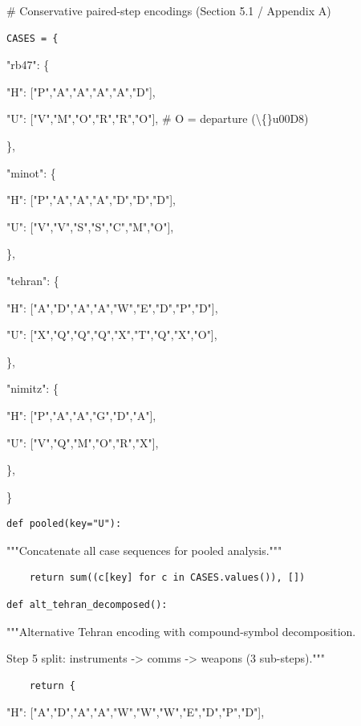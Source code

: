 \documentclass[11pt,letterpaper]{article}
\begin{document}
\# Conservative paired-step encodings (Section 5.1 / Appendix A)

\begin{lstlisting}
CASES = {
\end{lstlisting}

    "rb47": \{


        "H": ["P","A","A","A","A","D"],


        "U": ["V","M","O","R","R","O"],  \# O = departure (\textbackslash\{\}u00D8)


    \},


    "minot": \{


        "H": ["P","A","A","A","D","D","D"],


        "U": ["V","V","S","S","C","M","O"],


    \},


    "tehran": \{


        "H": ["A","D","A","A","W","E","D","P","D"],


        "U": ["X","Q","Q","Q","X","T","Q","X","O"],


    \},


    "nimitz": \{


        "H": ["P","A","A","G","D","A"],


        "U": ["V","Q","M","O","R","X"],


    \},


\}

\begin{lstlisting}
def pooled(key="U"):
\end{lstlisting}

    """Concatenate all case sequences for pooled analysis."""

\begin{lstlisting}
    return sum((c[key] for c in CASES.values()), [])
\end{lstlisting}
\begin{lstlisting}
def alt_tehran_decomposed():
\end{lstlisting}

    """Alternative Tehran encoding with compound-symbol decomposition.


    Step 5 split: instruments -> comms -> weapons (3 sub-steps)."""

\begin{lstlisting}
    return {
\end{lstlisting}

        "H": ["A","D","A","A","W","W","W","E","D","P","D"],
\end{document}
